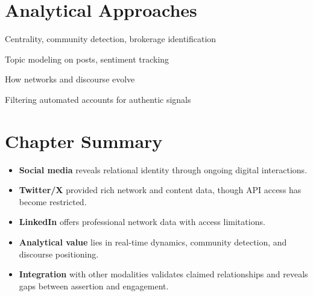 \documentclass[../main.tex]{subfiles}
\begin{document}


\section*{Analytical Approaches}

\begin{description}[leftmargin=0.5cm, itemsep=0.3em]
\item[Network Analysis] Centrality, community detection, brokerage identification
\item[Content Analysis] Topic modeling on posts, sentiment tracking
\item[Temporal Dynamics] How networks and discourse evolve
\item[Bot Detection] Filtering automated accounts for authentic signals
\end{description}


\section*{Chapter Summary}

\begin{summarybox}
\begin{itemize}[leftmargin=*, itemsep=0.3em]
\item \textbf{Social media} reveals relational identity through ongoing digital interactions.

\item \textbf{Twitter/X} provided rich network and content data, though API access has become restricted.

\item \textbf{LinkedIn} offers professional network data with access limitations.

\item \textbf{Analytical value} lies in real-time dynamics, community detection, and discourse positioning.

\item \textbf{Integration} with other modalities validates claimed relationships and reveals gaps between assertion and engagement.
\end{itemize}
\end{summarybox}
\end{document}
